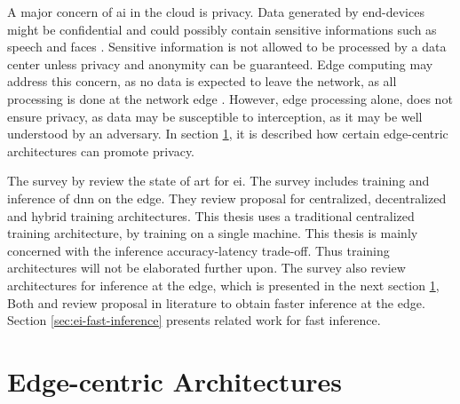 A major concern of \gls{ai} in the cloud is privacy. Data generated by end-devices might be confidential and could possibly contain sensitive informations such as speech and faces \cite{chen_deep_2019}. Sensitive information is not allowed to be processed by a data center unless privacy and anonymity can be guaranteed. Edge computing may address this concern, as no data is expected to leave the network, as all processing is done at the network edge \cite{chen_deep_2019}. However, edge processing alone, does not ensure privacy, as data may be susceptible to interception, as it may be well understood by an adversary. In section \ref{sec:ei-architecture}, it is described how certain edge-centric architectures can promote privacy. 
 
The survey  by \citet{zhou_edge_2019} review the state of art for \gls{ei}. The survey includes training and inference of \gls{dnn} on the edge. They review proposal for centralized, decentralized and hybrid training architectures. This thesis uses a traditional centralized training architecture, by training on a single machine. This thesis is mainly concerned with the inference accuracy-latency trade-off. Thus training architectures will not be elaborated further upon. The survey also review architectures for inference at the edge, which is presented in the next section \ref{sec:ei-architecture},  Both \cite{zhou_edge_2019} and \cite{chen_deep_2019} review proposal in literature to obtain faster inference at the edge. Section \ref{sec:ei-fast-inference} presents related work for fast inference. 

\newpage
\section{Edge-centric Architectures} \label{sec:ei-architecture}

